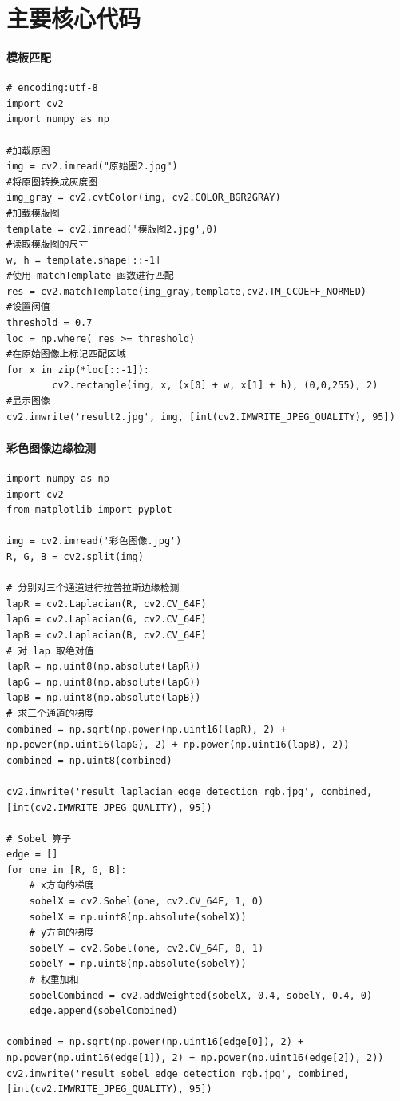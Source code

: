 \documentclass[11pt]{ctexart}
\begin{document}
\newpage
  
\section{主要核心代码}

\paragraph{模板匹配}

\lstset{language=python}
\begin{lstlisting}
# encoding:utf-8
import cv2
import numpy as np

#加载原图
img = cv2.imread("原始图2.jpg")
#将原图转换成灰度图
img_gray = cv2.cvtColor(img, cv2.COLOR_BGR2GRAY)
#加载模版图
template = cv2.imread('模版图2.jpg',0)
#读取模版图的尺寸
w, h = template.shape[::-1]
#使用 matchTemplate 函数进行匹配
res = cv2.matchTemplate(img_gray,template,cv2.TM_CCOEFF_NORMED)
#设置阀值
threshold = 0.7
loc = np.where( res >= threshold)
#在原始图像上标记匹配区域
for x in zip(*loc[::-1]):
        cv2.rectangle(img, x, (x[0] + w, x[1] + h), (0,0,255), 2)
#显示图像
cv2.imwrite('result2.jpg', img, [int(cv2.IMWRITE_JPEG_QUALITY), 95])
\end{lstlisting}

\paragraph{彩色图像边缘检测}

\lstset{language=python}
\begin{lstlisting}
import numpy as np
import cv2
from matplotlib import pyplot

img = cv2.imread('彩色图像.jpg')
R, G, B = cv2.split(img)

# 分别对三个通道进行拉普拉斯边缘检测
lapR = cv2.Laplacian(R, cv2.CV_64F)
lapG = cv2.Laplacian(G, cv2.CV_64F)
lapB = cv2.Laplacian(B, cv2.CV_64F)
# 对 lap 取绝对值
lapR = np.uint8(np.absolute(lapR))
lapG = np.uint8(np.absolute(lapG))
lapB = np.uint8(np.absolute(lapB))
# 求三个通道的梯度
combined = np.sqrt(np.power(np.uint16(lapR), 2) + np.power(np.uint16(lapG), 2) + np.power(np.uint16(lapB), 2))
combined = np.uint8(combined)

cv2.imwrite('result_laplacian_edge_detection_rgb.jpg', combined, [int(cv2.IMWRITE_JPEG_QUALITY), 95])

# Sobel 算子
edge = []
for one in [R, G, B]:
	# x方向的梯度
	sobelX = cv2.Sobel(one, cv2.CV_64F, 1, 0)
	sobelX = np.uint8(np.absolute(sobelX))
	# y方向的梯度
	sobelY = cv2.Sobel(one, cv2.CV_64F, 0, 1)
	sobelY = np.uint8(np.absolute(sobelY))
	# 权重加和
	sobelCombined = cv2.addWeighted(sobelX, 0.4, sobelY, 0.4, 0)
	edge.append(sobelCombined)

combined = np.sqrt(np.power(np.uint16(edge[0]), 2) + np.power(np.uint16(edge[1]), 2) + np.power(np.uint16(edge[2]), 2))
cv2.imwrite('result_sobel_edge_detection_rgb.jpg', combined, [int(cv2.IMWRITE_JPEG_QUALITY), 95])
\end{lstlisting}
\end{document}
